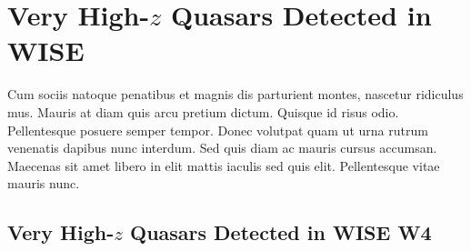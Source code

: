 \documentclass[usenatbib]{mnras}
\begin{document}




\section{Very High-$z$ Quasars Detected in WISE}
\citet{Blain2013} 
Cum sociis natoque penatibus et magnis dis parturient montes, nascetur
ridiculus mus. Mauris at diam quis arcu pretium dictum. Quisque id
risus odio. Pellentesque posuere semper tempor. Donec volutpat quam ut
urna rutrum venenatis dapibus nunc interdum. Sed quis diam ac mauris
cursus accumsan. Maecenas sit amet libero in elit mattis iaculis sed
quis elit. Pellentesque vitae mauris nunc.

\subsection{Very High-$z$ Quasars Detected in WISE W4}
\end{document}
